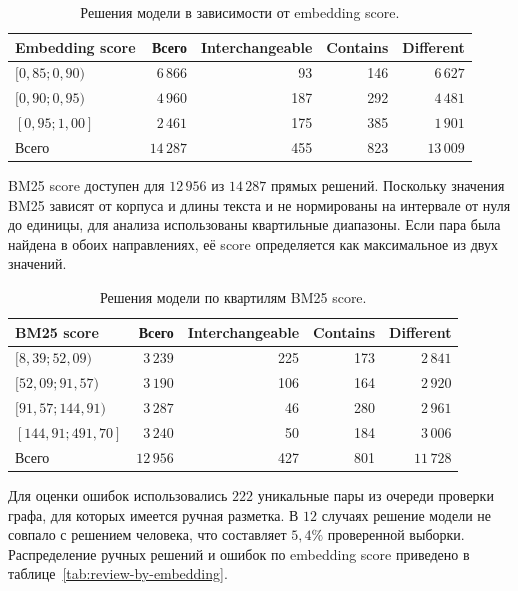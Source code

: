 \documentclass[12pt,a4paper]{article}
\begin{document}
\begin{table}[ht]
    \centering
    \small
    \begin{tabular}{lrrrr}
        \toprule
        Embedding score & Всего & Interchangeable & Contains & Different \\
        \midrule
        $[0{,}85; 0{,}90)$ & $6\,866$ & 93  & 146 & $6\,627$ \\
        $[0{,}90; 0{,}95)$ & $4\,960$ & 187 & 292 & $4\,481$ \\
        $[0{,}95; 1{,}00]$ & $2\,461$ & 175 & 385 & $1\,901$ \\
        \midrule
        Всего                & $14\,287$ & 455 & 823 & $13\,009$ \\
        \bottomrule
    \end{tabular}
    \caption{Решения модели в зависимости от embedding score.}
\end{table}

BM25 score доступен для $12\,956$ из $14\,287$ прямых решений. Поскольку
значения BM25 зависят от корпуса и длины текста и не нормированы на интервале
от нуля до единицы, для анализа использованы квартильные диапазоны. Если пара
была найдена в обоих направлениях, её score определяется как максимальное из
двух значений.

\begin{table}[ht]
    \centering
    \small
    \begin{tabular}{lrrrr}
        \toprule
        BM25 score & Всего & Interchangeable & Contains & Different \\
        \midrule
        $[8{,}39; 52{,}09)$    & $3\,239$ & 225 & 173 & $2\,841$ \\
        $[52{,}09; 91{,}57)$   & $3\,190$ & 106 & 164 & $2\,920$ \\
        $[91{,}57; 144{,}91)$  & $3\,287$ & 46  & 280 & $2\,961$ \\
        $[144{,}91; 491{,}70]$ & $3\,240$ & 50  & 184 & $3\,006$ \\
        \midrule
        Всего                   & $12\,956$ & 427 & 801 & $11\,728$ \\
        \bottomrule
    \end{tabular}
    \caption{Решения модели по квартилям BM25 score.}
    \label{tab:decisions-by-bm25}
\end{table}

Для оценки ошибок использовались $222$ уникальные пары из очереди проверки
графа, для которых имеется ручная разметка. В $12$ случаях решение модели не
совпало с решением человека, что составляет $5{,}4\%$ проверенной выборки.
Распределение ручных решений и ошибок по embedding score приведено в
таблице~\ref{tab:review-by-embedding}.
\end{document}
